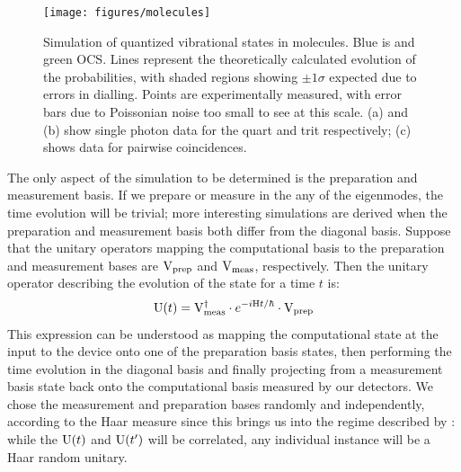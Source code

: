 \begin{figure}
  \centering
  \texttt{[image: figures/molecules]}
  \caption[Simulation of quantized vibrational states in molecules]
  {Simulation of quantized vibrational states in molecules. Blue is \co{} and
  green OCS. Lines represent the theoretically calculated evolution of the
  probabilities, with shaded regions showing \(\pm 1 \sigma\) expected due to
  errors in dialling. Points are experimentally measured, with error bars due to
  Poissonian noise too small to see at this scale. (a) and (b) show single
  photon data for the quart and trit respectively; (c) shows data for
  pairwise coincidences.}
  \label{fig:molecules}
\end{figure}

The only aspect of the simulation to be determined is the preparation and
measurement basis. If we prepare or measure in the any of the eigenmodes, the
time evolution will be trivial; more interesting simulations are derived when
the preparation and measurement basis both differ from the diagonal basis.
Suppose that the unitary
operators mapping the computational basis to the preparation and measurement
bases are \(\mathrm{V}_{\text{prep}}\) and \(\mathrm{V}_{\text{meas}}\), respectively. Then the
unitary operator describing the evolution of
the state for a time \(t\) is:
\begin{equation}
  \mathrm{U} \!\left(t\right) = \mathrm{V}_{\text{meas}}^{\dagger} \cdot e^{-i \mathrm{H} t/\hbar} \cdot
  \mathrm{V}_{\text{prep}}
\end{equation}
This expression can be understood as mapping the computational state at the
input to the device onto one of the preparation basis states, then performing
the time evolution in the diagonal basis and finally projecting from a
measurement basis state back onto the computational basis measured by our
detectors. We chose the measurement and preparation bases randomly and
independently, according to the Haar measure since this brings us into the
regime described by \bosonsampling{}: while the \(\mathrm{U} \!\left(t\right)\) and \(\mathrm{U}
\!\left(t^{\prime}\right) \) will be correlated, any individual instance will be a Haar
random unitary.

